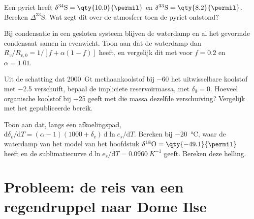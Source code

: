 \begin{exercise}[$\star\star$]\label{exo:b3:stable-isotopes:9}
Een pyriet heeft $\delta^{34}\mathrm S = \qty{10.0}{\permil}$ en $\delta^{33}\mathrm S =
\qty{8.2}{\permil}$. Bereken $\Delta^{33}\mathrm S$. Wat zegt dit over de
atmosfeer toen de pyriet ontstond?
\end{exercise}

\begin{exercise}[$\star\star\star$]\label{exo:b3:stable-isotopes:10}
Bij condensatie in een gesloten systeem blijven de waterdamp en al het gevormde
condensaat samen in evenwicht. Toon aan dat de waterdamp dan $R_v/R_{v,0} = 1/[f +
\alpha(1 - f)]$ heeft, en vergelijk dit met  voor $f = 0.2$ en
$\alpha = 1.01$.
\end{exercise}

\begin{exercise}[$\star\star\star$]\label{exo:b3:stable-isotopes:11}
Uit de schatting dat \qty{2000}{Gt} methaankoolstof bij
\qty{-60}{\permil} het uitwisselbare koolstof met \qty{-2.5}{\permil} verschuift,
bepaal de impliciete reservoirmassa, met $\delta_0 = 0$. Hoeveel organische koolstof bij
\qty{-25}{\permil} geeft met die massa dezelfde verschuiving? Vergelijk met het
gepubliceerde bereik.
\end{exercise}

\begin{exercise}[$\star\star\star$]\label{exo:b3:stable-isotopes:12}
Toon aan dat, langs een afkoelingspad, $\mathrm d\delta_v/\mathrm dT = (\alpha - 1)(1000 +
\delta_v)\,\mathrm d\ln e_s/\mathrm dT$. Bereken bij \qty{-20}{\celsius}, waar de
waterdamp van het model van het hoofdstuk $\delta^{18}\mathrm O = \qty{-49.1}{\permil}$
heeft en de sublimatiecurve $\mathrm d\ln e_s/\mathrm dT =
\qty{0.0960}{K^{-1}}$ geeft. Bereken deze helling.
\end{exercise}

\section{Probleem: de reis van een regendruppel naar Dome Ilse}

